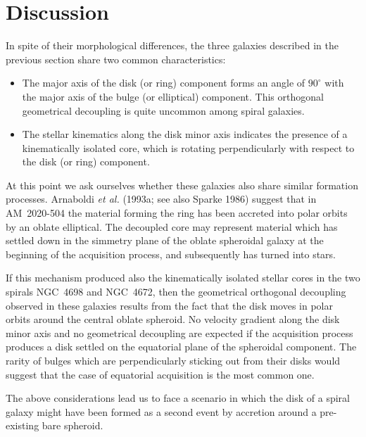 \section{Discussion}

In spite of their morphological differences, the three galaxies described in
the previous section share two common characteristics:

\begin{itemize}

\item[{\it (i)\/}] The major axis of the disk (or ring) component forms an
angle of $90^\circ$ with the major axis of the bulge (or elliptical)
component.  This orthogonal geometrical decoupling is quite uncommon among
spiral galaxies.

\item[{\it (ii)\/}] The stellar kinematics along the disk minor axis
indicates the presence of a kinematically isolated core, which is rotating
perpendicularly with respect to the disk (or ring) component.

\end{itemize}


At this point we ask ourselves whether these galaxies also share similar
formation processes.  Arnaboldi {\it et al.\/} (1993a; see also Sparke 1986)
suggest that in AM~2020-504 the material forming the ring has been accreted
into polar orbits by an oblate elliptical.  The decoupled core may represent
material which has settled down in the simmetry plane of the oblate
spheroidal galaxy at the beginning of the acquisition process, and
subsequently has turned into stars.

If this mechanism produced also the kinematically isolated stellar cores in
the two spirals NGC~4698 and NGC~4672, then the geometrical orthogonal
decoupling observed in these galaxies results from the fact that the disk
moves in polar orbits around the central oblate spheroid.  No velocity
gradient along the disk minor axis and no geometrical decoupling are
expected if the acquisition process produces a disk settled on the
equatorial plane of the spheroidal component.  The rarity of bulges which
are perpendicularly sticking out from their disks would suggest that the
case of equatorial acquisition is the most common one.

The above considerations lead us to face a scenario in which the disk of a
spiral galaxy might have been formed as a second event by accretion around a
pre-existing bare spheroid.


